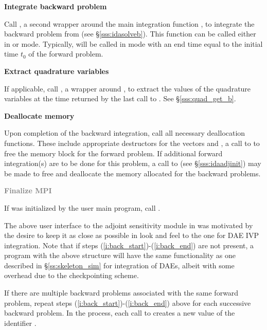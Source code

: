 \begin{Steps}
\item
  {\bf Integrate backward problem}

  Call , a second wrapper around the {\idas} main integration
  function , to integrate the backward problem from 
  (see \S\ref{sss:idasolveb}). This function can be called either in 
  or  mode. Typically,  will be called in 
  mode with an end time equal to the initial time $t_0$ of the forward problem.

\item \label{i:back_end}
  {\bf Extract quadrature variables}

  If applicable, call , a wrapper around ,
  to extract the values of the quadrature variables at the time returned
  by the last call to .  See \S\ref{sss:quad_get_b}.

\item
  {\bf Deallocate memory}

  Upon completion of the backward integration, call all necessary deallocation
  functions. These include appropriate destructors for the vectors  and
  , a call to  to free the {\idas} memory block for the
  forward problem.  If additional forward integration(s) are to be done for
  this problem, a call to  (see \S\ref{sss:idaadjinit}) may be
  made to free and deallocate the memory allocated for the backward problems.

\item
  \textcolor{gray}{\bf Finalize MPI}

  {\p} If {\mpi} was initialized by the user main program, call .

\end{Steps}

The above user interface to the adjoint sensitivity module in {\idas} was motivated by
the desire to keep it as close as possible in look and feel to the one for DAE IVP 
integration. Note that if steps (\ref{i:back_start})-(\ref{i:back_end}) are not present, 
a program with the above structure will have the same functionality as one described in
\S\ref{ss:skeleton_sim} for integration of DAEs, albeit with some overhead due to 
the checkpointing scheme.

If there are multiple backward problems associated with the same forward problem,
repeat steps (\ref{i:back_start})-(\ref{i:back_end}) above for each successive
backward problem.  In the process, each call to  creates a new
value of the identifier .

